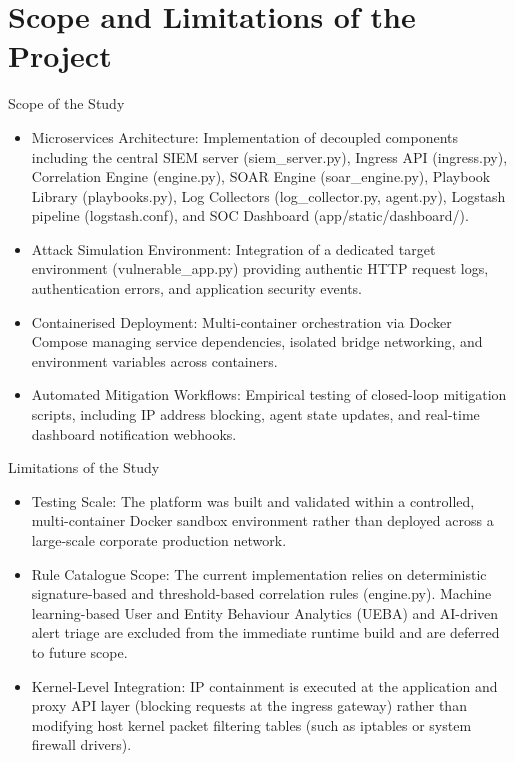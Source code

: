 \section{Scope and Limitations of the Project}

Scope of the Study

\begin{itemize}
  \item Microservices Architecture: Implementation of decoupled components including the central SIEM server (siem\_server.py), Ingress API (ingress.py), Correlation Engine (engine.py), SOAR Engine (soar\_engine.py), Playbook Library (playbooks.py), Log Collectors (log\_collector.py, agent.py), Logstash pipeline (logstash.conf), and SOC Dashboard (app/static/dashboard/).
  \item Attack Simulation Environment: Integration of a dedicated target environment (vulnerable\_app.py) providing authentic HTTP request logs, authentication errors, and application security events.
  \item Containerised Deployment: Multi-container orchestration via Docker Compose managing service dependencies, isolated bridge networking, and environment variables across containers.
  \item Automated Mitigation Workflows: Empirical testing of closed-loop mitigation scripts, including IP address blocking, agent state updates, and real-time dashboard notification webhooks.
\end{itemize}

Limitations of the Study

\begin{itemize}
  \item Testing Scale: The platform was built and validated within a controlled, multi-container Docker sandbox environment rather than deployed across a large-scale corporate production network.
  \item Rule Catalogue Scope: The current implementation relies on deterministic signature-based and threshold-based correlation rules (engine.py). Machine learning-based User and Entity Behaviour Analytics (UEBA) and AI-driven alert triage are excluded from the immediate runtime build and are deferred to future scope.
  \item Kernel-Level Integration: IP containment is executed at the application and proxy API layer (blocking requests at the ingress gateway) rather than modifying host kernel packet filtering tables (such as iptables or system firewall drivers).
\end{itemize}

